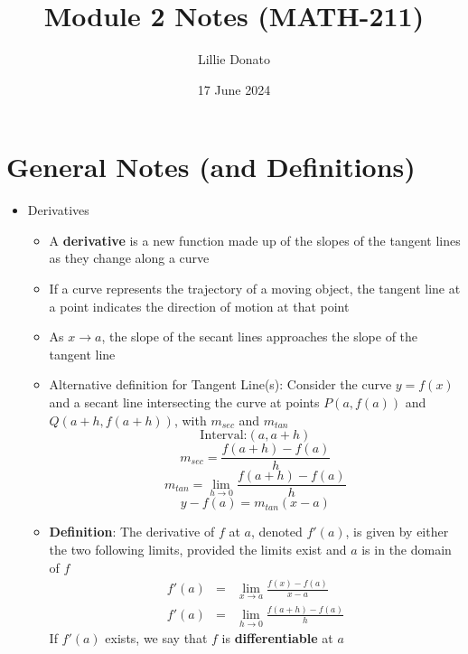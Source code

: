 \documentclass{article}
\title{Module 2 Notes (MATH-211)}
\author{Lillie Donato}
\date{17 June 2024}
\begin{document}
\maketitle

\section*{General Notes (and Definitions)}
\begin{itemize}
    \item Derivatives
    \begin{itemize}
        \item A \textbf{derivative} is a new function made up of the slopes of the tangent lines as they change along a curve
        \item If a curve represents the trajectory of a moving object, the tangent line at a point indicates the direction of motion at that point
        \item As $x \to a$, the slope of the secant lines approaches the slope of the tangent line
        \item Alternative definition for Tangent Line(s): Consider the curve $y = f(x)$ and a secant line intersecting the curve at points $P(a, f(a))$ and $Q(a + h, f(a + h))$, with $m_{sec}$ and $m_{tan}$
        $$\text{Interval:} (a, a + h)$$
        $$m_{sec} = \frac{f(a + h) - f(a)}{h}$$
        $$m_{tan} = \lim_{h \to 0}{\frac{f(a + h) - f(a)}{h}}$$
        $$y - f(a) = m_{tan}(x - a)$$
        \item \textbf{Definition}: The derivative of $f$ at $a$, denoted $f'(a)$, is given by either the two following limits, provided the limits exist and $a$ is in the domain of $f$
        \begin{eqnarray}
            f'(a) &=& \lim_{x \to a}{\frac{f(x) - f(a)}{x - a}} \\
            f'(a) &=& \lim_{h \to 0}{\frac{f(a + h) - f(a)}{h}}
        \end{eqnarray}
        If $f'(a)$ exists, we say that $f$ is \textbf{differentiable} at $a$
    \end{itemize}
\end{itemize}
\end{document}
